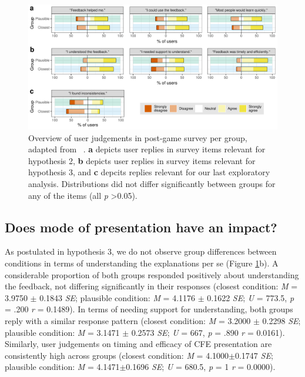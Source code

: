 {\begin{figure}
   \centering
   \includegraphics[width=\textwidth]{./media/H2_H3_expl_survey_T_PAZ_FINAL.pdf}
   \caption{Overview of user judgements in post-game survey per group, adapted from ~\citep{holzinger_measuring_2020}. \textbf{a} depicts user replies in survey items relevant for hypothesis 2, \textbf{b} depicts user replies in survey items relevant for hypothesis 3, and \textbf{c} depcits replies relevant for our last exploratory analysis. Distributions did not differ significantly between groups for any of the items (all \textit{p} \textgreater 0.05).}
   \label{fig:survey}
 \end{figure}

\subsection{Does mode of presentation have an impact?}
As postulated in hypothesis 3, we do not observe group differences between conditions in terms of understanding the explanations per se (Figure \ref{fig:survey}b). 
A considerable proportion of both groups responded positively about understanding the feedback, not differing significantly in their responses (closest condition: \textit{M} = 3.9750 $\pm$ 0.1843 \textit{SE}; plausible condition: \textit{M} = 4.1176 $\pm$ 0.1622 \textit{SE}; \textit{U} = 773.5, \textit{p} = .200 \textit{r} = 0.1489).
In terms of needing support for understanding, both groups reply with a similar response pattern (closest condition: \textit{M} = 3.2000 $\pm$ 0.2298 \textit{SE}; plausible condition: \textit{M} = 3.1471 $\pm$ 0.2573 \textit{SE}; \textit{U} = 667, \textit{p} = .890 \textit{r} = 0.0161).
Similarly, user judgements on timing and efficacy of  CFE presentation are consistently high across groups (closest condition: \textit{M} = 4.1000$\pm$0.1747 \textit{SE}; plausible condition: \textit{M} = 4.1471$\pm$0.1696 \textit{SE}; \textit{U} = 680.5, \textit{p} = 1 \textit{r} = 0.0000).

}

